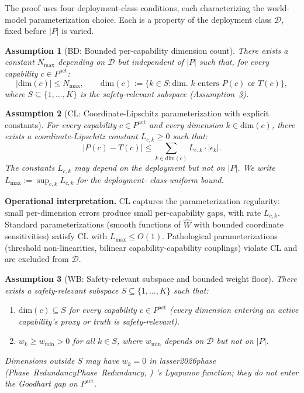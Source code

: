 \documentclass{article}
\makeatletter
\newcommand{\citep}[2][]{%
  \begingroup
  \def\@tmpkey{#2}%
  \ifx\@tmpkey\@empty\else
    (\ifx\@empty#1\@empty\else #1, \fi
     \@nameuse{bibkey@\@tmpkey})%
  \fi
  \endgroup
}
\newtheorem{assumption}{Assumption}
\newcommand{\Wm}{\hat{W}}
\makeatother
\begin{document}
The proof uses four deployment-class conditions, each
characterizing the world-model parameterization choice. Each is a
property of the deployment class $\mathcal{D}$, fixed before $|P|$
is varied.

\begin{assumption}[BD: Bounded per-capability dimension count]
\label{ass:BD}
There exists a constant $N_{\max}$ depending on $\mathcal{D}$ but
independent of $|P|$ such that, for every capability $c \in
P^{\mathrm{act}}$:
\[
  |\mathrm{dim}(c)| \leq N_{\max}, \qquad
  \mathrm{dim}(c) := \{k \in S :
  \text{dim. } k \text{ enters } P(c) \text{ or } T(c)\},
\]
where $S \subseteq \{1, \ldots, K\}$ is the safety-relevant subspace
(Assumption~\ref{ass:WB}).
\end{assumption}

\begin{assumption}[CL: Coordinate-Lipschitz parameterization with explicit constants]
\label{ass:CL}
For every capability $c \in P^{\mathrm{act}}$ and every dimension
$k \in \mathrm{dim}(c)$, there exists a coordinate-Lipschitz
constant $L_{c,k} \geq 0$ such that:
\[
  |P(c) - T(c)| \leq \sum_{k \in \mathrm{dim}(c)} L_{c,k} \cdot
  |\epsilon_k|.
\]
The constants $L_{c,k}$ may depend on the deployment but not on
$|P|$. We write $L_{\max} := \sup_{c, k} L_{c,k}$ for the deployment-
class-uniform bound.
\end{assumption}

\textbf{Operational interpretation.} CL captures the parameterization
regularity: small per-dimension errors produce small per-capability
gaps, with rate $L_{c,k}$.  Standard parameterizations (smooth
functions of $\Wm$ with bounded coordinate sensitivities) satisfy
CL with $L_{\max} \leq O(1)$.  Pathological parameterizations
(threshold non-linearities, bilinear capability-capability
couplings) violate CL and are excluded from $\mathcal{D}$.

\begin{assumption}[WB: Safety-relevant subspace and bounded weight floor]
\label{ass:WB}
There exists a safety-relevant subspace $S \subseteq \{1, \ldots,
K\}$ such that:
\begin{enumerate}
\item $\mathrm{dim}(c) \subseteq S$ for every capability $c \in
  P^{\mathrm{act}}$ (every dimension entering an active capability's
  proxy or truth is safety-relevant).
\item $w_k \geq w_{\min} > 0$ for all $k \in S$, where $w_{\min}$
  depends on $\mathcal{D}$ but not on $|P|$.
\end{enumerate}
Dimensions outside $S$ may have $w_k = 0$ in
\citep[Phase~Redundancy]{lasser2026phase}'s Lyapunov function;
they do not enter the Goodhart gap on $P^{\mathrm{act}}$.
\end{assumption}
\end{document}
